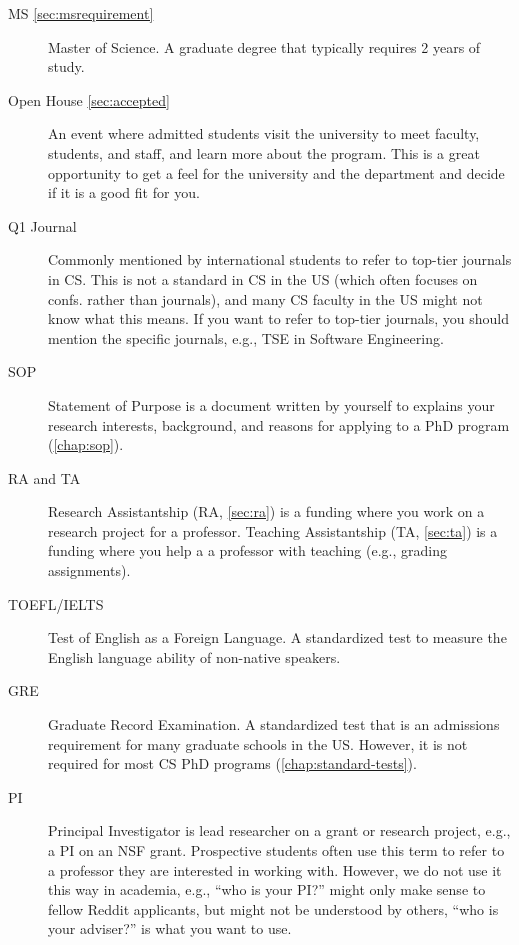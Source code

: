 \documentclass[oneside,11pt,dvipsnames]{book}
\begin{document}
\begin{description}
  \item[MS \autoref{sec:msrequirement}] Master of Science. A graduate degree that typically requires 2 years of study.

  \item[Open House \autoref{sec:accepted}] An event where admitted students visit the university to meet faculty, students, and staff, and learn more about the program. This is a great opportunity to get a feel for the university and the department and decide if it is a good fit for you.
  
  \item[Q1 Journal] Commonly mentioned by international students to refer to top-tier journals in CS.  This is not a standard in CS in the US (which often focuses on confs. rather than journals), and many CS faculty in the US might not know what this means.  If you want to refer to top-tier journals, you should mention the specific journals, e.g., TSE in Software Engineering.
  
  \item[SOP] Statement of Purpose is a document written by yourself to explains your research interests, background, and reasons for applying to a PhD program (\autoref{chap:sop}).

  \item[RA and TA] Research Assistantship (RA, \autoref{sec:ra}) is a funding where you work on a research project for a professor. Teaching Assistantship (TA, \autoref{sec:ta}) is a funding where you help a a professor with teaching (e.g., grading assignments).

  \item[TOEFL/IELTS] Test of English as a Foreign Language. A standardized test to measure the English language ability of non-native speakers.
  \item[GRE] Graduate Record Examination. A standardized test that is an admissions requirement for many graduate schools in the US. However, it is not required for most CS PhD programs (\autoref{chap:standard-tests}).

  \item [PI]  Principal Investigator is lead researcher on a grant or research project, e.g., a PI on an NSF grant.  Prospective students often use this term to refer to a professor they are interested in working with.  However, we do not use it this way in academia, e.g., ``who is your PI?'' might only make sense to fellow Reddit applicants, but might not be understood by others, ``who is your adviser?'' is what you want to use.


\end{description}
\end{document}
